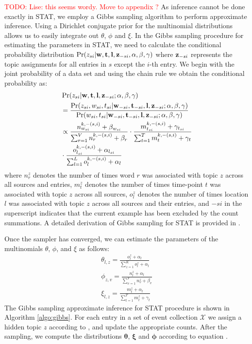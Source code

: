 \documentclass[conference]{IEEEtran}
\newcommand{\model}{{STAT}\xspace} %
\newcommand{\w}{{\bf w}}
\newcommand{\z}{{\bf z}}
\newcommand{\loc}{{\bf l}}
\newcommand{\tim}{{\bf t}}
\newcommand{\todo}[1]{\textcolor{red}{{TODO: #1}}}
\begin{document}
\todo{Lise: this seems wordy. Move to appendix ?} As inference cannot be done exactly in \model, we employ a Gibbs sampling algorithm to perform approximate inference. Using a Dirichlet conjugate prior for the multinomial distributions allows us to easily integrate out $\theta$, $\phi$ and $\xi$.  In the Gibbs sampling procedure for estimating the parameters in \model, we need to calculate the conditional probability distribution $\Pr(z_{si}|{\bf w},{\bf t}, {\bf l}, {\bf z}_{-si}, \alpha, \beta, \gamma)$ where ${\bf z}_{-si}$ represents the topic assignments for all entries in $s$ except the $i$-th entry. We begin with the joint probability of a data set and using the chain rule we obtain the conditional probability as:
\begin{align}
\label{eq:conditional}
&\Pr(z_{si}| \w,\tim,\loc,\z_{-si};\alpha,\beta,\gamma) \nonumber \\
&= \frac{\Pr(z_{si}, w_{si}, t_{si}|\w_{-si},\tim_{-si},\loc,\z_{-si};\alpha,\beta,\gamma)}{\Pr(w_{si}, t_{si}|\w_{-si},\tim_{-si},\loc,\z_{-si};\alpha,\beta,\gamma)} \nonumber \\
& \propto \frac{n^{k,-(s,i)}_{w_{si}} + \beta_{w_{si}}}{\sum_{r = 1}^V n^{k,-(s,i)}_{r} + \beta_{r}} \cdot \frac{m^{k,-(s,i)}_{t_{si}} + \gamma_{t_{si}}}{\sum_{t = 1}^T m^{k,-(s,i)}_{t} + \gamma_{t}} \nonumber \\
& \cdot \frac{o^{k,-(s,i)}_{l_{si}} + \alpha_{l_{si}}}{\sum_{l = 1}^L o^{k,-(s,i)}_{l} + \alpha_{l}}
\end{align}
where $n^{z}_{r}$ denotes the number of times word $r$ was associated with topic $z$ across all sources and entries, $m^{z}_{t}$ denotes the number of times time-point $t$ was associated with topic $z$ across all sources, $o^z_l$ denotes the number of times location $l$ was associated with topic $z$ across all sources and their entries, and $-si$ in the superscript indicates that the current example has been excluded by the count summations. A detailed derivation of Gibbs sampling for \model is provided in . 

Once the sampler has converged, we can estimate the parameters of the multinomials $\theta$, $\phi$, and $\xi$ as follows:
\begin{align}
\label{eq:updates}
\theta_{l,z} = \frac{o^z_l + \alpha_l}{\sum_{z=1}^K o^z_l + \alpha_l} \nonumber \\
\phi_{z,v} = \frac{n^z_l + \alpha_l}{\sum_{v=1}^V n^z_v + \beta_v}  \\
\xi_{l,z} = \frac{m^z_t + \alpha_l}{\sum_{t=1}^T m^z_t + \gamma_t} \nonumber
\end{align}
The Gibbs sampling approximate inference for \model procedure is shown in Algorithm \ref{algo:gibbs}. For each entry in a set of event collection $\mathcal{X}$ we assign a hidden topic $z$ according to , and update the appropriate counts. After the sampling, we compute the distributions ${\boldsymbol \theta}$, ${\boldsymbol \xi}$ and ${\boldsymbol \phi}$ according to equation . 
\end{document}
